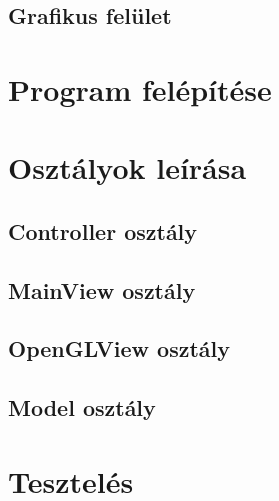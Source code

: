 \documentclass{elteikthesis}
\begin{document}
\subsection{Grafikus felület}
\section{Program felépítése}
\section{Osztályok leírása}
\subsection{Controller osztály}
\subsection{MainView osztály}
\subsection{OpenGLView osztály}
\subsection{Model osztály}
\section{Tesztelés}
\end{document}
